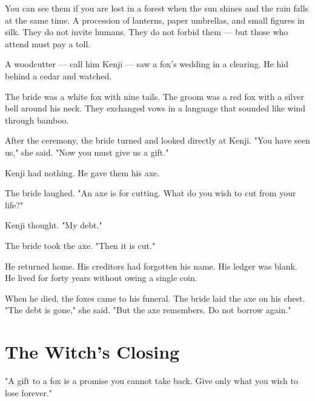 \documentclass[10pt,twoside]{book}
\begin{document}
You can see them if you are lost in a forest when the sun shines and the rain falls at the same time. A procession of lanterns, paper umbrellas, and small figures in silk. They do not invite humans. They do not forbid them --- but those who attend must pay a toll.

A woodcutter --- call him Kenji --- saw a fox's wedding in a clearing. He hid behind a cedar and watched.

The bride was a white fox with nine tails. The groom was a red fox with a silver bell around his neck. They exchanged vows in a language that sounded like wind through bamboo.

After the ceremony, the bride turned and looked directly at Kenji. "You have seen us," she said. "Now you must give us a gift."

Kenji had nothing. He gave them his axe.

The bride laughed. "An axe is for cutting. What do you wish to cut from your life?"

Kenji thought. "My debt."

The bride took the axe. "Then it is cut."

He returned home. His creditors had forgotten his name. His ledger was blank. He lived for forty years without owing a single coin.

When he died, the foxes came to his funeral. The bride laid the axe on his chest. "The debt is gone," she said. "But the axe remembers. Do not borrow again."

\section*{The Witch's Closing}
"A gift to a fox is a promise you cannot take back. Give only what you wish to lose forever."
\end{document}
